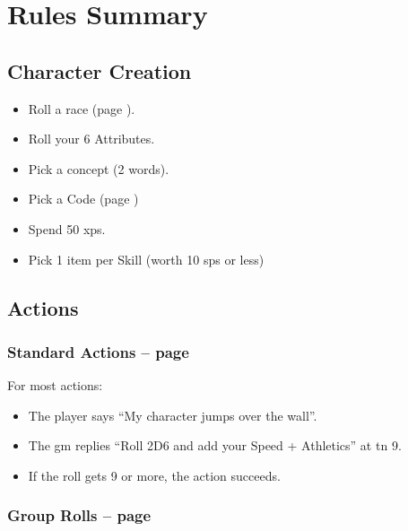 \section*{Rules Summary}

\begin{multicols}{2}

\subsection{Character Creation}

\begin{itemize}

  \item
  Roll a race (page \pageref{raceRoll}).
  \item
  Roll your 6 Attributes.
  \item
  Pick a concept (2 words).
  \item
  Pick a Code (page \pageref{gods_codes})
  \item
  Spend 50 \glspl{xp}.
  \item
  Pick 1 item per Skill (worth 10 \glspl{sp} or less)

\end{itemize}

\subsection{Actions}

\subsubsection{Standard Actions -- page \pageref{basicaction}}

For most actions:

\begin{itemize}

  \item
  The player says ``My character jumps over the wall''.
  \item
  The \gls{gm} replies ``Roll 2D6 and add your Speed + Athletics'' at \gls{tn} 9.
  \item
  If the roll gets 9 or more, the action succeeds.

\end{itemize}

\subsubsection{Group Rolls -- page \pageref{grouproll}}


\end{multicols}
